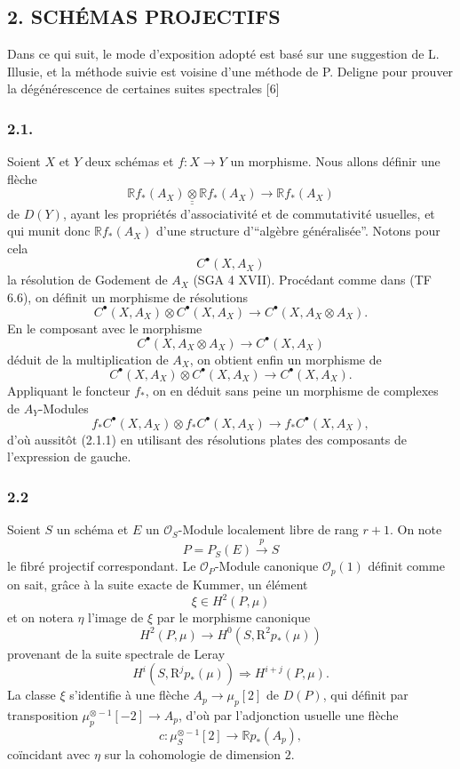 \subsection*{2. SCHÉMAS PROJECTIFS}

Dans ce qui suit, le mode d'exposition adopté est basé sur une suggestion de L. Illusie, et la méthode suivie est voisine d'une méthode de P. Deligne pour prouver la dégénérescence de certaines suites spectrales [6]

\subsubsection*{2.1.}
Soient $X$ et $Y$ deux schémas et $f:X\to Y$ un morphisme. Nous allons définir une flèche
\[
\mathbb{R} f_*(A_X)\mathbin{\underline{\underline{\otimes}}} \mathbb{R} f_*(A_X)\longrightarrow \mathbb{R} f_*(A_X)
\tag{2.1.1}
\]
de $D(Y)$, ayant les propriétés d'associativité et de commutativité usuelles, et qui munit donc $\mathbb{R} f_*(A_X)$ d'une structure d'``algèbre généralisée''. Notons pour cela
\[
C^{\bullet}(X,A_X)
\]
la
résolution de Godement de $A_X$ (SGA 4 XVII). Procédant comme dans (TF 6.6), on définit un morphisme de résolutions
\[
C^{\bullet}(X,A_X)\otimes C^{\bullet}(X,A_X)\longrightarrow C^{\bullet}(X,A_X\otimes A_X).
\]
En le composant avec le morphisme
\[
C^{\bullet}(X,A_X\otimes A_X)\longrightarrow C^{\bullet}(X,A_X)
\]
déduit de la multiplication de $A_X$, on obtient enfin un morphisme de
\[
C^{\bullet}(X,A_X)\otimes C^{\bullet}(X,A_X)\longrightarrow C^{\bullet}(X,A_X).
\tag{2.1.2}
\]
Appliquant le foncteur $f_*$, on en déduit sans peine un morphisme de complexes de $A_Y$-Modules
\[
f_*C^{\bullet}(X,A_X)\otimes f_*C^{\bullet}(X,A_X)\longrightarrow f_*C^{\bullet}(X,A_X),
\]
d'où aussitôt (2.1.1) en utilisant des résolutions plates des composants de l'expression de gauche.

\subsubsection*{2.2}
Soient $S$ un schéma et $E$ un $\mathcal{O}_S$-Module localement libre de rang $r+1$. On note
\[
P=P_S(E)\xrightarrow{p}S
\]
le fibré projectif correspondant. Le $\mathcal{O}_P$-Module canonique $\mathcal{O}_p(1)$ définit comme on sait, grâce à la suite exacte de Kummer, un élément
\[
\xi\in H^2(P,\mu)
\]
et on notera $\eta$ l'image de $\xi$ par le morphisme canonique
\[
H^2(P,\mu)\longrightarrow H^0(S,\mathrm{R}^2p_*(\mu))
\]
provenant de la suite spectrale de Leray
\[
H^i(S,\mathrm{R}^jp_*(\mu))\Rightarrow H^{i+j}(P,\mu).
\]
La classe $\xi$ s'identifie à une flèche $A_p\to\mu_p[2]$ de $D(P)$, qui définit par transposition $\mu_p^{\otimes -1}[-2]\to A_p$, d'où par l'adjonction usuelle une flèche
\[
c:\mu_S^{\otimes -1}[2]\longrightarrow \mathbb{R} p_*(A_p),
\]
coïncidant avec $\eta$ sur la cohomologie de dimension $2$.

